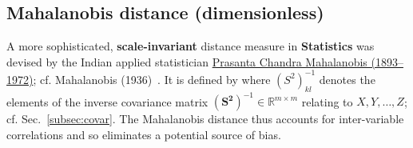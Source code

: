 \subsection*{Mahalanobis distance \hfill (dimensionless)}
A more sophisticated, {\bf scale-invariant} distance measure in 
{\bf Statistics} was devised by the Indian applied statistician 
\href{http://www-history.mcs.st-and.ac.uk/Biographies/Mahalanobis.html}{Prasanta Chandra Mahalanobis (1893--1972)}; cf. Mahalanobis 
(1936)~. It is defined by
%
\be
{}
\ee
%
where $(S^{2})^{-1}_{kl}$ denotes the elements of the inverse
covariance matrix $(\boldsymbol{S^{2}})^{-1} \in
\mathbb{R}^{m \times m}$ relating to $X, Y, \ldots, Z$; cf.
Sec.~\ref{subsec:covar}. The Mahalanobis distance thus accounts for
inter-variable correlations and so eliminates a potential source of
bias.

